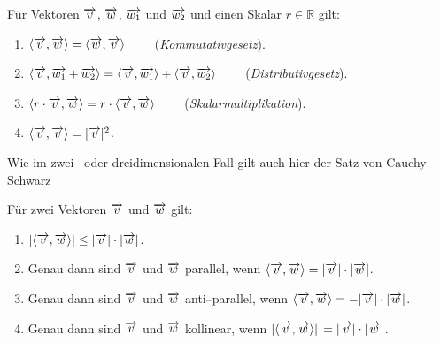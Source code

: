 \begin{regel}\label{uvr_regel_scalar} Für Vektoren $\overrightarrow{v}$, $\overrightarrow{w}$, 
$\overrightarrow{w_1}$ und $\overrightarrow{w_2}$ und einen Skalar $r \in \mathbb R$ gilt:
\begin{enumerate}
\item $\langle \overrightarrow{v}, \overrightarrow{w} \rangle = \langle \overrightarrow{w}, 
\overrightarrow{v} \rangle \qquad$ (\textit{Kommutativgesetz}).
\item $\langle \overrightarrow{v}, \overrightarrow{w_1} + \overrightarrow{w_2} \rangle = 
\langle \overrightarrow{v}, \overrightarrow{w_1} \rangle + \langle \overrightarrow{v}, 
\overrightarrow{w_2} \rangle \qquad$ (\textit{Distributivgesetz}).
\item $\langle r \cdot \overrightarrow{v}, \overrightarrow{w} \rangle = r \cdot \langle \overrightarrow{v}, 
\overrightarrow{w} \rangle \qquad$ (\textit{Skalarmultiplikation}).
\item $\langle \overrightarrow{v}, \overrightarrow{v} \rangle = \vert \overrightarrow{v} \vert^2$.
\end{enumerate}
\end{regel}

Wie im zwei-- oder dreidimensionalen Fall gilt auch hier der  
Satz von Cauchy--Schwarz 

\begin{satz}\label{uvr_cauchy_schwarz} 
Für zwei Vektoren $\overrightarrow{v}$ und $\overrightarrow{w}$ gilt:
\begin{enumerate}
\item $ \vert \langle \overrightarrow{v},  \overrightarrow{w} \rangle \vert \leq \vert \overrightarrow{v} 
        \vert \cdot \vert \overrightarrow{w} \vert $.
\item Genau dann sind $\overrightarrow{v}$ und $\overrightarrow{w}$ parallel, wenn $\langle \overrightarrow{v}, 
\overrightarrow{w} \rangle = \vert \overrightarrow{v} \vert \cdot  \vert \overrightarrow{w} \vert$.
\item Genau dann sind $\overrightarrow{v}$ und $\overrightarrow{w}$ anti--parallel, wenn $\langle 
\overrightarrow{v}, \overrightarrow{w} \rangle = 
- \vert \overrightarrow{v} \vert \cdot  \vert \overrightarrow{w} \vert$.
\item Genau dann sind $\overrightarrow{v}$ und $\overrightarrow{w}$ kollinear, wenn 
$\vert \langle \overrightarrow{v}, \overrightarrow{w} \rangle \vert \, 
= \vert \overrightarrow{v} \vert \cdot  \vert \overrightarrow{w} \vert$.
\end{enumerate}
\end{satz}

